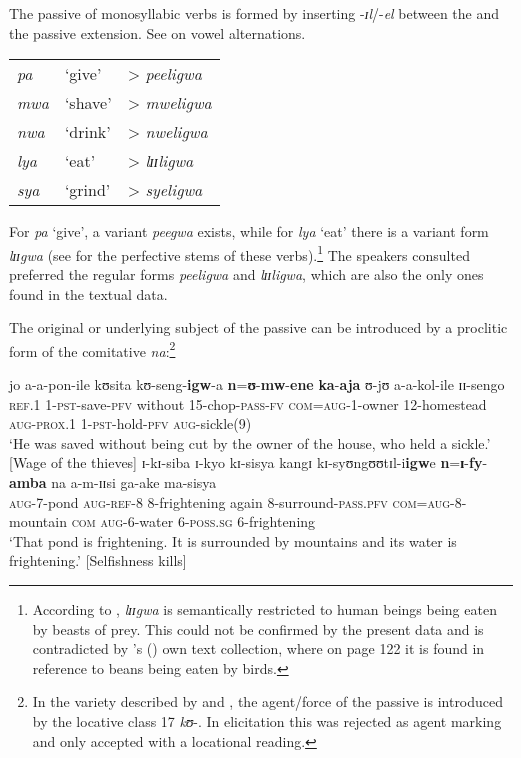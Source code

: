 The passive of monosyllabic verbs is formed by inserting -\textit{ɪl}/-\textit{el} between the  and the passive extension. See  on vowel alternations.
\begin{exe}
\ex
\begin{tabular}[t]{lll} 
\textit{pa}&`give'& > \textit{peeligwa}\\
\textit{mwa}&`shave'& > \textit{mweligwa}\\
\textit{nwa}&`drink'& > \textit{nweligwa}\\
\textit{lya}&`eat'& > \textit{lɪɪligwa}\\
\textit{sya}&`grind'& > \textit{syeligwa}
\end{tabular}
\end{exe}

For \textit{pa} \lq give', a variant \textit{peegwa} exists, while for \textit{lya} \lq eat' there is a variant form \textit{lɪɪgwa} (see  for the perfective stems of these verbs).\footnote{According to \citet[212f]{BergerP1938}, \textit{lɪɪgwa} is semantically restricted to human beings being eaten by beasts of prey. This could not be confirmed by the present data and is contradicted by \citeauthor{BergerP1933}'s (\citeyear{BergerP1933}) own text collection, where on page 122 it is found in reference to beans being eaten by birds.} The speakers consulted preferred the regular forms \textit{peeligwa} and \textit{lɪɪligwa}, which are also the only ones found in the textual data.

The original or underlying subject of the passive can be introduced by a proclitic form of the comitative \textit{na}:\footnote{In the variety described by \citet[35]{SchumannK1899} and \citet[88]{EndemannC1914}, the agent/force of the passive is introduced by the locative class 17 \textit{kʊ}-. In elicitation this was rejected as agent marking and only accepted with a locational reading.}
\begin{exe}
\ex \gll jo a-a-pon-ile kʊsita kʊ-seng-\textbf{igw}-a \textbf{n}=\textbf{ʊ}-\textbf{mw}-\textbf{ene} \textbf{ka}-\textbf{aja} ʊ-jʊ a-a-kol-ile ɪɪ-sengo\\
\textsc{ref.1} 1-\textsc{pst}-save-\textsc{pfv} without 15-chop-\textsc{pass}-\textsc{fv} \textsc{com}=\textsc{aug}-1-owner 12-homestead \textsc{aug}-\textsc{prox.1} 1-\textsc{pst}-hold-\textsc{pfv} \textsc{aug}-sickle(9)\\
\glt `He was saved without being cut by the owner of the house, who held a sickle.' [Wage of the thieves]
\ex \gll ɪ-kɪ-siba ɪ-kyo kɪ-sisya kangɪ kɪ-syʊngʊʊtɪl-i\textbf{igw}e \textbf{n}=\textbf{ɪ}-\textbf{fy}-\textbf{amba} na a-m-ɪɪsi ga-ake ma-sisya\\
\textsc{aug}-7-pond \textsc{aug}-\textsc{ref-8} 8-frightening again 8-surround-\textsc{pass.pfv} \textsc{com}=\textsc{aug}-8-mountain \textsc{com} \textsc{aug}-6-water 6-\textsc{poss.sg} 6-frightening\\
\glt `That pond is frightening. It is surrounded by mountains and its water is frightening.' [Selfishness kills]
\end{exe}

